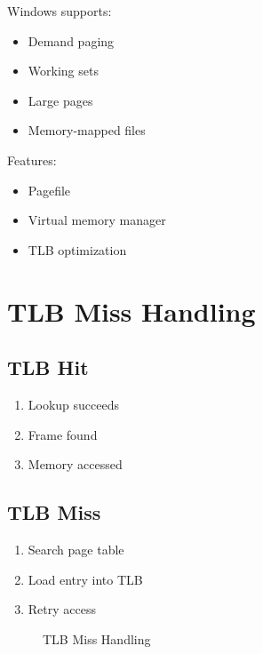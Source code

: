 Windows supports:

\begin{itemize}
\item Demand paging
\item Working sets
\item Large pages
\item Memory-mapped files
\end{itemize}

Features:

\begin{itemize}
\item Pagefile
\item Virtual memory manager
\item TLB optimization
\end{itemize}

\section{TLB Miss Handling}

\subsection{TLB Hit}

\begin{enumerate}
\item Lookup succeeds
\item Frame found
\item Memory accessed
\end{enumerate}

\subsection{TLB Miss}

\begin{enumerate}
\item Search page table
\item Load entry into TLB
\item Retry access
\end{enumerate}

\begin{figure}[H]
\centering
{}
\caption{TLB Miss Handling}
\end{figure}

